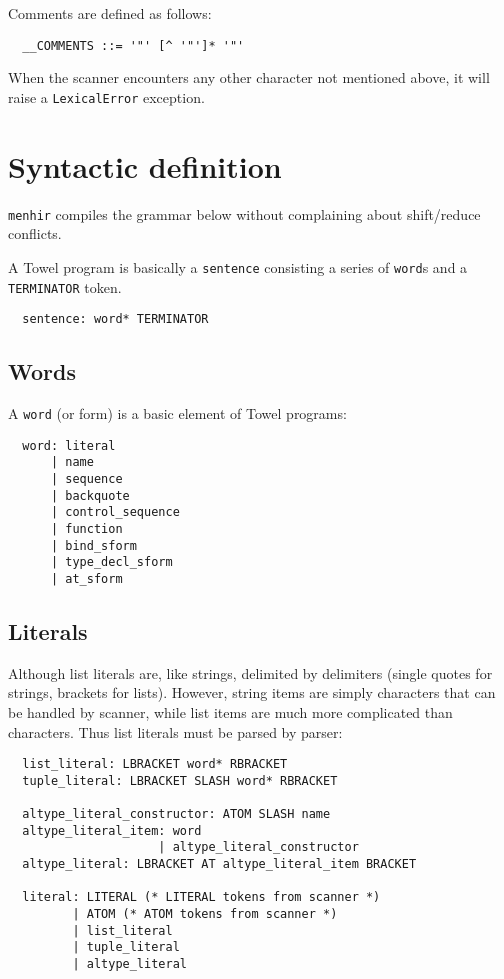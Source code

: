 \documentclass{book}
\begin{document}
Comments are defined as follows:
\begin{verbatim}
  __COMMENTS ::= '"' [^ '"']* '"'
\end{verbatim}

When the scanner encounters any other character not mentioned above, it will raise a \texttt{LexicalError} exception.

\section{Syntactic definition}

\texttt{menhir} compiles the grammar below without complaining about shift/reduce conflicts.

A Towel program is basically a \texttt{sentence} consisting a series of \texttt{word}s and a \texttt{TERMINATOR} token.
\begin{verbatim}
  sentence: word* TERMINATOR
\end{verbatim}

\subsection{Words}
\label{ssec:words}

A \texttt{word} (or form) is a basic element of Towel programs:
\begin{verbatim}
  word: literal
      | name
      | sequence
      | backquote
      | control_sequence
      | function
      | bind_sform
      | type_decl_sform
      | at_sform
\end{verbatim}

\subsection{Literals}

Although list literals are, like strings, delimited by delimiters (single quotes for strings, brackets for lists). However, string items are simply characters that can be handled by scanner, while list items are much more complicated than characters. Thus list literals must be parsed by parser:
\begin{verbatim}
  list_literal: LBRACKET word* RBRACKET
  tuple_literal: LBRACKET SLASH word* RBRACKET

  altype_literal_constructor: ATOM SLASH name
  altype_literal_item: word
                     | altype_literal_constructor
  altype_literal: LBRACKET AT altype_literal_item BRACKET

  literal: LITERAL (* LITERAL tokens from scanner *)
         | ATOM (* ATOM tokens from scanner *)
         | list_literal
         | tuple_literal
         | altype_literal
\end{verbatim}
\end{document}
